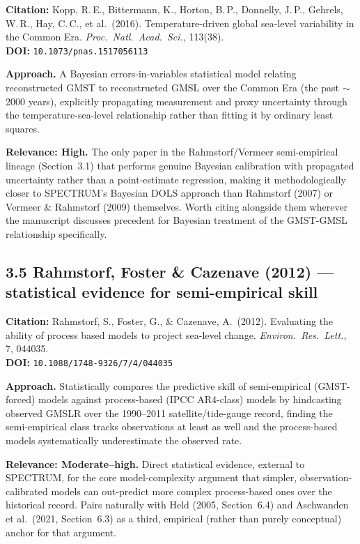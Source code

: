 \documentclass[11pt]{article}
\begin{document}
\noindent\textbf{Citation:} Kopp, R.\,E., Bittermann, K., Horton, B.\,P.,
Donnelly, J.\,P., Gehrels, W.\,R., Hay, C.\,C., et al.\ (2016).
Temperature-driven global sea-level variability in the Common Era.
\textit{Proc.\ Natl.\ Acad.\ Sci.}, 113(38).\\
\textbf{DOI:} \texttt{10.1073/pnas.1517056113}

\noindent\textbf{Approach.} A Bayesian errors-in-variables statistical model
relating reconstructed GMST to reconstructed GMSL over the Common Era
(the past $\sim$2000 years), explicitly propagating measurement and proxy
uncertainty through the temperature-sea-level relationship rather than
fitting it by ordinary least squares.

\noindent\textbf{Relevance: High.} The only paper in the Rahmstorf/Vermeer
semi-empirical lineage (Section~3.1) that performs genuine Bayesian
calibration with propagated uncertainty rather than a point-estimate
regression, making it methodologically closer to SPECTRUM's Bayesian DOLS
approach than Rahmstorf (2007) or Vermeer \& Rahmstorf (2009) themselves.
Worth citing alongside them wherever the manuscript discusses precedent for
Bayesian treatment of the GMST-GMSL relationship specifically.

\subsection*{3.5 Rahmstorf, Foster \& Cazenave (2012) --- statistical evidence for semi-empirical skill}

\noindent\textbf{Citation:} Rahmstorf, S., Foster, G., \& Cazenave, A.\
(2012). Evaluating the ability of process based models to project
sea-level change. \textit{Environ.\ Res.\ Lett.}, 7, 044035.\\
\textbf{DOI:} \texttt{10.1088/1748-9326/7/4/044035}

\noindent\textbf{Approach.} Statistically compares the predictive skill of
semi-empirical (GMST-forced) models against process-based (IPCC AR4-class)
models by hindcasting observed GMSLR over the 1990--2011 satellite/tide-gauge
record, finding the semi-empirical class tracks observations at least as
well and the process-based models systematically underestimate the observed
rate.

\noindent\textbf{Relevance: Moderate--high.} Direct statistical evidence,
external to SPECTRUM, for the core model-complexity argument that simpler,
observation-calibrated models can out-predict more complex process-based
ones over the historical record. Pairs naturally with Held (2005,
Section~6.4) and Aschwanden et al.\ (2021, Section~6.3) as a third,
empirical (rather than purely conceptual) anchor for that argument.
\end{document}
